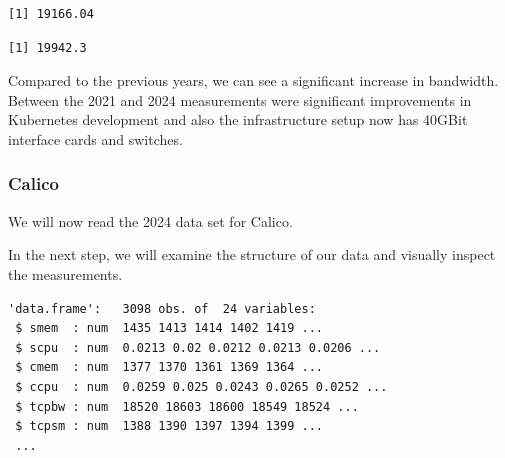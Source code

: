 \begin{verbatim}
[1] 19166.04
\end{verbatim}

\begin{Shaded}
\begin{Highlighting}[]
\SpecialCharTok{\$}
\end{Highlighting}
\end{Shaded}

\begin{verbatim}
[1] 19942.3
\end{verbatim}

Compared to the previous years, we can see a significant increase in bandwidth. Between the 2021 and 2024 measurements were significant improvements in Kubernetes development and also the infrastructure setup now has 40GBit interface cards and switches.

\subsubsection{Calico}

We will now read the 2024 data set for Calico.

\begin{Shaded}
\begin{Highlighting}[]
\OtherTok{\textless{}{-}} 
\OtherTok{\textless{}{-}} \NormalTok{(}\NormalTok{,}\NormalTok{))}
\end{Highlighting}
\end{Shaded}

In the next step, we will examine the structure of our data and visually
inspect the measurements.

\begin{Shaded}
\begin{Highlighting}[]
\end{Highlighting}
\end{Shaded}

\begin{verbatim}
'data.frame':   3098 obs. of  24 variables:
 $ smem  : num  1435 1413 1414 1402 1419 ...
 $ scpu  : num  0.0213 0.02 0.0212 0.0213 0.0206 ...
 $ cmem  : num  1377 1370 1361 1369 1364 ...
 $ ccpu  : num  0.0259 0.025 0.0243 0.0265 0.0252 ...
 $ tcpbw : num  18520 18603 18600 18549 18524 ...
 $ tcpsm : num  1388 1390 1397 1394 1399 ...
 ...
\end{verbatim}

